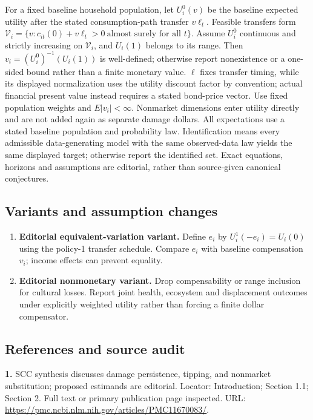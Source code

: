 \documentclass[11pt,a4paper]{article}
\begin{document}
For a fixed baseline household population, let \(U_i^0(v)\) be the baseline expected utility after the stated consumption-path transfer \(v\ell_t\). Feasible transfers form \(\mathcal V_i=\{v:c_{it}(0)+v\ell_t>0\ \text{almost surely for all }t\}\). Assume \(U_i^0\) continuous and strictly increasing on \(\mathcal V_i\), and \(U_i(1)\) belongs to its range. Then \(v_i=(U_i^0)^{-1}(U_i(1))\) is well-defined; otherwise report nonexistence or a one-sided bound rather than a finite monetary value. \(\ell\) fixes transfer timing, while its displayed normalization uses the utility discount factor by convention; actual financial present value instead requires a stated bond-price vector. Use fixed population weights and \(E|v_i|<\infty\). Nonmarket dimensions enter utility directly and are not added again as separate damage dollars. All expectations use a stated baseline population and probability law. Identification means every admissible data-generating model with the same observed-data law yields the same displayed target; otherwise report the identified set. Exact equations, horizons and assumptions are editorial, rather than source-given canonical conjectures.
\subsection*{Variants and assumption changes}
\begin{enumerate}
\item \textbf{Editorial equivalent-variation variant.} Define \(e_i\) by \(U_i^1(-e_i)=U_i(0)\) using the policy-1 transfer schedule. Compare \(e_i\) with baseline compensation \(v_i\); income effects can prevent equality.
\item \textbf{Editorial nonmonetary variant.} Drop compensability or range inclusion for cultural losses. Report joint health, ecosystem and displacement outcomes under explicitly weighted utility rather than forcing a finite dollar compensator.
\end{enumerate}
\subsection*{References and source audit}
\textbf{1.} SCC synthesis discusses damage persistence, tipping, and nonmarket substitution; proposed estimands are editorial. Locator: Introduction; Section 1.1; Section 2. Full text or primary publication page inspected. URL: \url{https://pmc.ncbi.nlm.nih.gov/articles/PMC11670083/}.
\end{document}
